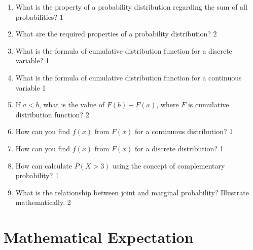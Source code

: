 \documentclass[a4paper,oneside]{book}
\begin{document}
\begin{enumerate}
\item What is the property of a probability distribution regarding the sum of all probabilities? \hfill 1

\item What are the required properties of a probability distribution? \hfill 2

\item What is the formula of cumulative distribution function for a discrete variable? \hfill 1

\item What is the formula of cumulative distribution function for a continuous variable \hfill 1

\item If $a<b$, what is the value of $F(b) - F(a)$, where $F$ is cumulative distribution function? \hfill 2

\item How can you find $f(x)$ from $F(x)$ for a continuous distribution? \hfill 1

\item How can you find $f(x)$ from $F(x)$ for a discrete distribution? \hfill 1

  \item How can calculate $P(X>3)$ using the concept of complementary probability?  \hfill 1

\item What is the relationship between joint and marginal probability? Illustrate mathematically. \hfill 2


  \end{enumerate}

\chapter{Mathematical Expectation} 
\end{document}
